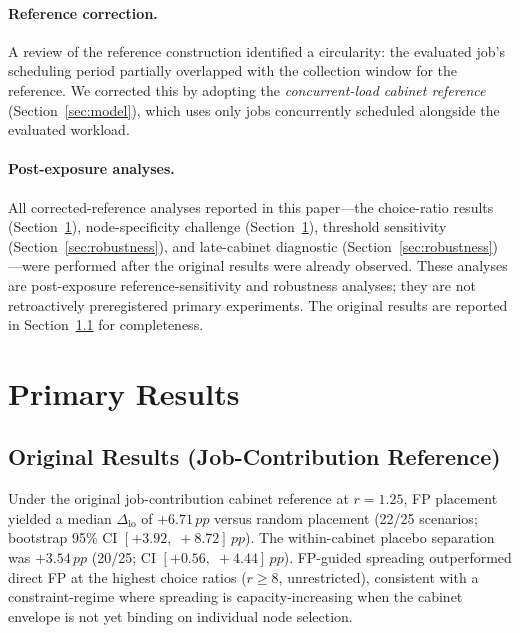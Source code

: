 \documentclass[acmsmall,screen,review,anonymous]{acmart}
\newcommand{\dlo}{\ensuremath{\Delta_{\mathrm{lo}}}\xspace}
\newcommand{\pp}{\,pp\xspace}
\begin{document}
\paragraph{Reference correction.}
A review of the reference construction identified a circularity: the evaluated job's
scheduling period partially overlapped with the collection window for the reference.
We corrected this by adopting the \emph{concurrent-load cabinet reference}
(Section~\ref{sec:model}), which uses only jobs concurrently scheduled alongside the
evaluated workload.

\paragraph{Post-exposure analyses.}
All corrected-reference analyses reported in this paper---the choice-ratio results
(Section~\ref{sec:results}), node-specificity challenge (Section~\ref{sec:results}),
threshold sensitivity (Section~\ref{sec:robustness}), and late-cabinet diagnostic
(Section~\ref{sec:robustness})---were performed after the original results were already
observed.  These analyses are post-exposure reference-sensitivity and robustness analyses;
they are not retroactively preregistered primary experiments.  The original results are
reported in Section~\ref{sec:original} for completeness.

\section{Primary Results}
\label{sec:results}

\subsection{Original Results (Job-Contribution Reference)}
\label{sec:original}

Under the original job-contribution cabinet reference at $r = 1.25$, FP placement
yielded a median $\dlo$ of $+6.71\pp$ versus random placement (22/25 scenarios;
bootstrap 95\% CI $[+3.92,\;+8.72]\pp$).  The within-cabinet placebo separation
was $+3.54\pp$ (20/25; CI $[+0.56,\;+4.44]\pp$).  FP-guided spreading outperformed
direct FP at the highest choice ratios ($r \geq 8$, unrestricted), consistent with
a constraint-regime where spreading is capacity-increasing when the cabinet envelope
is not yet binding on individual node selection.
\end{document}
